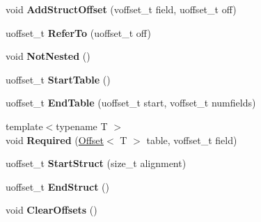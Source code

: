 \begin{DoxyCompactItemize}
\item 
\mbox{\label{classflatbuffers_1_1FlatBufferBuilder_a9de51fe44c441c9ea85fcfd51dc5b33b}} 
void {\bfseries Add\+Struct\+Offset} (voffset\+\_\+t field, uoffset\+\_\+t off)
\item 
\mbox{\label{classflatbuffers_1_1FlatBufferBuilder_a62999f8123570f017857ec4bbd513f2a}} 
uoffset\+\_\+t {\bfseries Refer\+To} (uoffset\+\_\+t off)
\item 
\mbox{\label{classflatbuffers_1_1FlatBufferBuilder_aacf8e58f3dfd2f838352b39ee71c5304}} 
void {\bfseries Not\+Nested} ()
\item 
\mbox{\label{classflatbuffers_1_1FlatBufferBuilder_a2a049ecb11945705285786f3d1841d80}} 
uoffset\+\_\+t {\bfseries Start\+Table} ()
\item 
\mbox{\label{classflatbuffers_1_1FlatBufferBuilder_adc1ed2c5b32742b04b2417ba7ae1a877}} 
uoffset\+\_\+t {\bfseries End\+Table} (uoffset\+\_\+t start, voffset\+\_\+t numfields)
\item 
\mbox{\label{classflatbuffers_1_1FlatBufferBuilder_a0f38735d32e2b331740a90f456083699}} 
{\footnotesize template$<$typename T $>$ }\\void {\bfseries Required} (\hyperlink{structflatbuffers_1_1Offset}{Offset}$<$ T $>$ table, voffset\+\_\+t field)
\item 
\mbox{\label{classflatbuffers_1_1FlatBufferBuilder_a3ac0bf8d0486cf76408d12e973381b23}} 
uoffset\+\_\+t {\bfseries Start\+Struct} (size\+\_\+t alignment)
\item 
\mbox{\label{classflatbuffers_1_1FlatBufferBuilder_afbf85c5f68c115eadfd1ba021f609657}} 
uoffset\+\_\+t {\bfseries End\+Struct} ()
\item 
\mbox{\label{classflatbuffers_1_1FlatBufferBuilder_a6c1703607d0b9f41e2a7a0d0f91ae9ec}} 
void {\bfseries Clear\+Offsets} ()

\end{DoxyCompactItemize}
